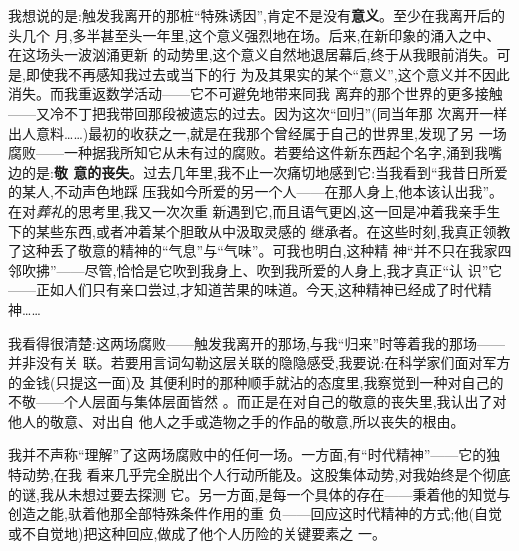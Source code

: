 我想说的是:触发我离开的那桩“特殊诱因”,肯定不是没有\textbf{意义}。至少在我离开后的头几个
月,多半甚至头一年里,这个意义强烈地在场。后来,在新印象的涌入之中、在这场头一波汹涌更新
的动势里,这个意义自然地退居幕后,终于从我眼前消失。可是,即使我不再感知我过去或当下的行
为及其果实的某个“意义”,这个意义并不因此消失。而我重返数学活动——它不可避免地带来同我
离弃的那个世界的更多接触——又冷不丁把我带回那段被遗忘的过去。因为这次“回归”(同当年那
次离开一样出人意料……)最初的收获之一,就是在我那个曾经属于自己的世界里,发现了另
一场腐败——一种据我所知它从未有过的腐败。若要给这件新东西起个名字,涌到我嘴边的是:\textbf{敬
意的丧失}。过去几年里,我不止一次痛切地感到它:当我看到“我昔日所爱的某人,不动声色地踩
压我如今所爱的另一个人——在那人身上,他本该认出我”。在对\emph{葬礼}的思考里,我又一次次重
新遇到它,而且语气更凶,这一回是冲着我亲手生下的某些东西,或者冲着某个胆敢从中汲取灵感的
继承者。在这些时刻,我真正领教了这种丢了敬意的精神的“气息”与“气味”。可我也明白,这种精
神“并不只在我家四邻吹拂”——尽管,恰恰是它吹到我身上、吹到我所爱的人身上,我才真正“认
识”它——正如人们只有亲口尝过,才知道苦果的味道。今天,这种精神已经成了时代精神……

我看得很清楚:这两场腐败——触发我离开的那场,与我“归来”时等着我的那场——并非没有关
联。若要用言词勾勒这层关联的隐隐感受,我要说:\dmark{}在科学家们面对军方的金钱(只提这一面)及
其便利时的那种顺手就沾的态度里,我察觉到一种对自己的不敬——个人层面与集体层面皆然
。而正是在对自己的敬意的丧失里,我认出了对他人的敬意、对出自
他人之手或造物之手的作品的敬意,所以丧失的根由。

我并不声称“理解”了这两场腐败中的任何一场。一方面,有“时代精神”——它的独特动势,在我
看来几乎完全脱出个人行动所能及。这股集体动势,对我始终是个彻底的谜,我从未想过要去探测
它。另一方面,是每一个具体的存在——秉着他的知觉与创造之能,驮着他那全部特殊条件作用的重
负——回应这时代精神的方式;他(自觉或不自觉地)把这种回应,做成了他个人历险的关键要素之
一。

